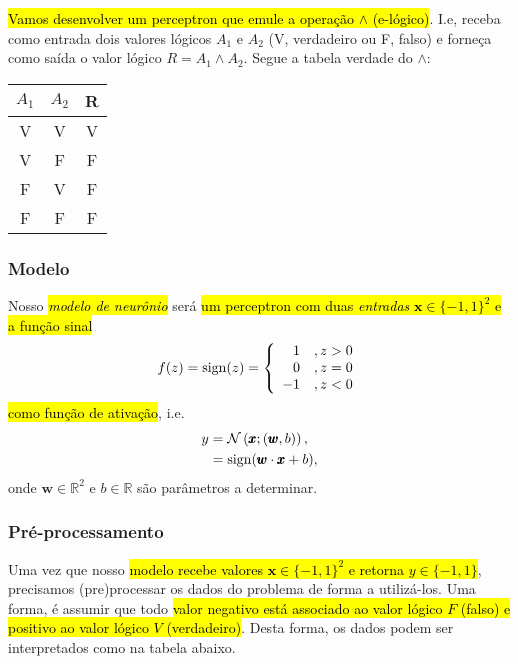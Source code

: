 \hl{Vamos desenvolver um perceptron que emule a operação $\land$ (e-lógico)}. I.e, receba como entrada dois valores lógicos $A_1$ e $A_2$ (V, verdadeiro ou F, falso) e forneça como saída o valor lógico $R = A_1 \land A_2$. Segue a tabela verdade do $\land$:

\begin{center}
  \begin{tabular}{cc|c}
    $A_1$ & $A_2$ & R\\\hline
    V & V & V\\
    V & F & F\\
    F & V & F\\
    F & F & F\\\hline
  \end{tabular}
\end{center}


\subsubsection{Modelo}

Nosso \hl{\emph{modelo de neurônio}} será \hl{um perceptron com duas \emph{entradas} $\pmb{x}\in \{-1,1\}^2$ e a função sinal}
\begin{equation}
  f(z) = \operatorname{sign}(z) = \left\{
    \begin{array}{rr}
      1 &, z>0\\
      0 &, z=0\\
      -1 &, z<0
    \end{array}
\right.
\end{equation}
\hl{como função de ativação}, i.e.
\begin{align}
  y &= \mathcal{N}\left(\pmb{x}; (\pmb{w}, b)\right),\\
    &= \operatorname{sign}(\pmb{w}\cdot\pmb{x} + b),
\end{align}
onde $\pmb{w}\in\mathbb{R}^2$ e $b\in\mathbb{R}$ são parâmetros a determinar.


\subsubsection{Pré-processamento}

Uma vez que nosso \hl{modelo recebe valores $\pmb{x}\in \{-1,1\}^2$ e retorna $y\in\{-1,1\}$}, precisamos (pre)processar os dados do problema de forma a utilizá-los. Uma forma, é assumir que todo \hl{valor negativo está associado ao valor lógico $F$ (falso) e positivo ao valor lógico $V$ (verdadeiro)}. Desta forma, os dados podem ser interpretados como na tabela abaixo.

